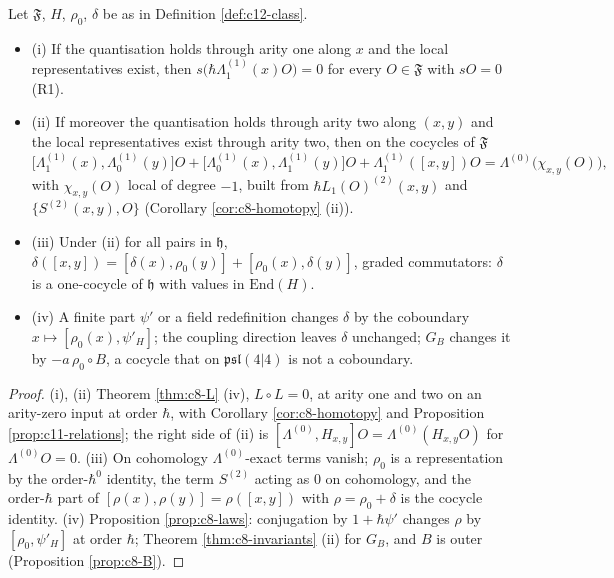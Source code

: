 \begin{theorem}
\label{thm:c12-opalg}
Let $\mathfrak F$, $H$, $\rho_0$, $\delta$ be as in Definition \ref{def:c12-class}.
\begin{itemize}
\item (i) If the quantisation holds through arity one along $x$ and the local representatives exist, then $s\big(\hbar\Lambda^{(1)}_1(x)O\big)=0$ for every $O\in\mathfrak F$ with $sO=0$ (R1).
\item (ii) If moreover the quantisation holds through arity two along $(x,y)$ and the local representatives exist through arity two, then on the cocycles of $\mathfrak F$
\begin{equation}
\big[\Lambda^{(1)}_1(x),\Lambda^{(1)}_0(y)\big]O+\big[\Lambda^{(1)}_0(x),\Lambda^{(1)}_1(y)\big]O+\Lambda^{(1)}_1([x,y])O=\Lambda^{(0)}\big(\chi_{x,y}(O)\big),
\label{eq:c12-Rxy}
\end{equation}
with $\chi_{x,y}(O)$ local of degree $-1$, built from $\hbar L_1(O)^{(2)}(x,y)$ and $\{S^{(2)}(x,y),O\}$ (Corollary \ref{cor:c8-homotopy} (ii)).
\item (iii) Under (ii) for all pairs in $\mathfrak h$, $\delta([x,y])=[\delta(x),\rho_0(y)]+[\rho_0(x),\delta(y)]$, graded commutators: $\delta$ is a one-cocycle of $\mathfrak h$ with values in $\mathrm{End}(H)$.
\item (iv) A finite part $\psi'$ or a field redefinition changes $\delta$ by the coboundary $x\mapsto[\rho_0(x),\psi'_H]$; the coupling direction leaves $\delta$ unchanged; $G_B$ changes it by $-a\,\rho_0\circ B$, a cocycle that on $\mathfrak{psl}(4|4)$ is not a coboundary.
\end{itemize}
\end{theorem}

\begin{proof}
(i), (ii) Theorem \ref{thm:c8-L} (iv), $L\circ L=0$, at arity one and two on an arity-zero input at order $\hbar$, with Corollary \ref{cor:c8-homotopy} and Proposition \ref{prop:c11-relations}; the right side of (ii) is $[\Lambda^{(0)},H_{x,y}]O=\Lambda^{(0)}(H_{x,y}O)$ for $\Lambda^{(0)}O=0$. (iii) On cohomology $\Lambda^{(0)}$-exact terms vanish; $\rho_0$ is a representation by the order-$\hbar^0$ identity, the term $S^{(2)}$ acting as $0$ on cohomology, and the order-$\hbar$ part of $[\rho(x),\rho(y)]=\rho([x,y])$ with $\rho=\rho_0+\delta$ is the cocycle identity. (iv) Proposition \ref{prop:c8-laws}: conjugation by $1+\hbar\psi'$ changes $\rho$ by $[\rho_0,\psi'_H]$ at order $\hbar$; Theorem \ref{thm:c8-invariants} (ii) for $G_B$, and $B$ is outer (Proposition \ref{prop:c8-B}).
\end{proof}

